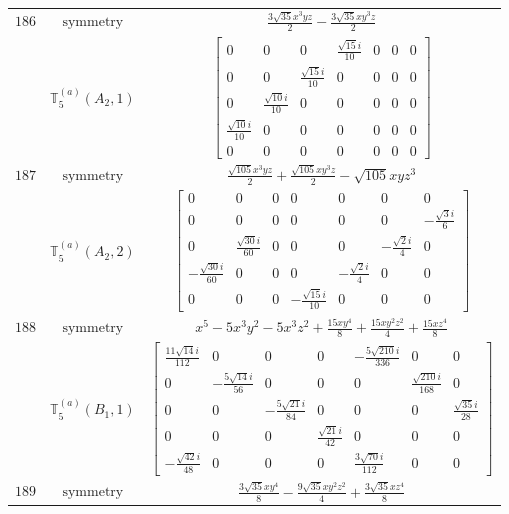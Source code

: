 \documentclass[fleqn,8pt,landscape]{jsarticle}
\begin{document}
\begin{longtable}{ccc}
$ 186 $ & $ \text{symmetry} $ & $ \frac{3 \sqrt{35} x^{3} y z}{2} - \frac{3 \sqrt{35} x y^{3} z}{2} $ \\
$  $ & $ \mathbb{T}_{5}^{(a)}(A_{2},1) $ & $ \begin{bmatrix} 0 & 0 & 0 & \frac{\sqrt{15} i}{10} & 0 & 0 & 0 \\ 0 & 0 & \frac{\sqrt{15} i}{10} & 0 & 0 & 0 & 0 \\ 0 & \frac{\sqrt{10} i}{10} & 0 & 0 & 0 & 0 & 0 \\ \frac{\sqrt{10} i}{10} & 0 & 0 & 0 & 0 & 0 & 0 \\ 0 & 0 & 0 & 0 & 0 & 0 & 0 \end{bmatrix} $ \\ \hline
$ 187 $ & $ \text{symmetry} $ & $ \frac{\sqrt{105} x^{3} y z}{2} + \frac{\sqrt{105} x y^{3} z}{2} - \sqrt{105} x y z^{3} $ \\
$  $ & $ \mathbb{T}_{5}^{(a)}(A_{2},2) $ & $ \begin{bmatrix} 0 & 0 & 0 & 0 & 0 & 0 & 0 \\ 0 & 0 & 0 & 0 & 0 & 0 & - \frac{\sqrt{3} i}{6} \\ 0 & \frac{\sqrt{30} i}{60} & 0 & 0 & 0 & - \frac{\sqrt{2} i}{4} & 0 \\ - \frac{\sqrt{30} i}{60} & 0 & 0 & 0 & - \frac{\sqrt{2} i}{4} & 0 & 0 \\ 0 & 0 & 0 & - \frac{\sqrt{15} i}{10} & 0 & 0 & 0 \end{bmatrix} $ \\ \hline
$ 188 $ & $ \text{symmetry} $ & $ x^{5} - 5 x^{3} y^{2} - 5 x^{3} z^{2} + \frac{15 x y^{4}}{8} + \frac{15 x y^{2} z^{2}}{4} + \frac{15 x z^{4}}{8} $ \\
$  $ & $ \mathbb{T}_{5}^{(a)}(B_{1},1) $ & $ \begin{bmatrix} \frac{11 \sqrt{14} i}{112} & 0 & 0 & 0 & - \frac{5 \sqrt{210} i}{336} & 0 & 0 \\ 0 & - \frac{5 \sqrt{14} i}{56} & 0 & 0 & 0 & \frac{\sqrt{210} i}{168} & 0 \\ 0 & 0 & - \frac{5 \sqrt{21} i}{84} & 0 & 0 & 0 & \frac{\sqrt{35} i}{28} \\ 0 & 0 & 0 & \frac{\sqrt{21} i}{42} & 0 & 0 & 0 \\ - \frac{\sqrt{42} i}{48} & 0 & 0 & 0 & \frac{3 \sqrt{70} i}{112} & 0 & 0 \end{bmatrix} $ \\ \hline
$ 189 $ & $ \text{symmetry} $ & $ \frac{3 \sqrt{35} x y^{4}}{8} - \frac{9 \sqrt{35} x y^{2} z^{2}}{4} + \frac{3 \sqrt{35} x z^{4}}{8} $ \\

\end{longtable}
\end{document}
